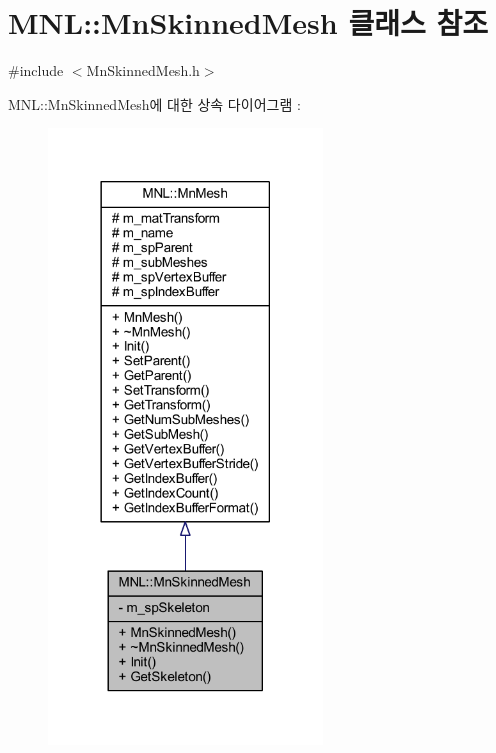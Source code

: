 \hypertarget{class_m_n_l_1_1_mn_skinned_mesh}{}\section{M\+NL\+:\+:Mn\+Skinned\+Mesh 클래스 참조}
\label{class_m_n_l_1_1_mn_skinned_mesh}


{\ttfamily \#include $<$Mn\+Skinned\+Mesh.\+h$>$}



M\+NL\+:\+:Mn\+Skinned\+Mesh에 대한 상속 다이어그램 \+: \nopagebreak
\begin{figure}[H]
\begin{center}
\leavevmode
\includegraphics[width=206pt]{class_m_n_l_1_1_mn_skinned_mesh__inherit__graph}
\end{center}
\end{figure}


